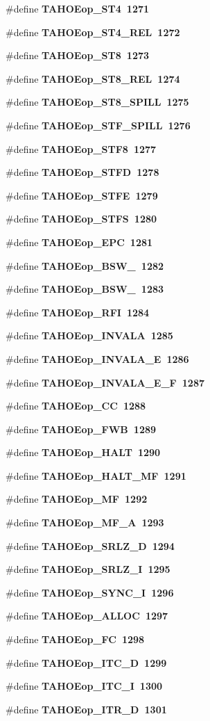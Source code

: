\begin{CompactItemize}
\#define \bf{TAHOEop\_\-ST4}~1271
\item 
\#define \bf{TAHOEop\_\-ST4\_\-REL}~1272
\item 
\#define \bf{TAHOEop\_\-ST8}~1273
\item 
\#define \bf{TAHOEop\_\-ST8\_\-REL}~1274
\item 
\#define \bf{TAHOEop\_\-ST8\_\-SPILL}~1275
\item 
\#define \bf{TAHOEop\_\-STF\_\-SPILL}~1276
\item 
\#define \bf{TAHOEop\_\-STF8}~1277
\item 
\#define \bf{TAHOEop\_\-STFD}~1278
\item 
\#define \bf{TAHOEop\_\-STFE}~1279
\item 
\#define \bf{TAHOEop\_\-STFS}~1280
\item 
\#define \bf{TAHOEop\_\-EPC}~1281
\item 
\#define \bf{TAHOEop\_\-BSW\_}~1282
\item 
\#define \bf{TAHOEop\_\-BSW\_}~1283
\item 
\#define \bf{TAHOEop\_\-RFI}~1284
\item 
\#define \bf{TAHOEop\_\-INVALA}~1285
\item 
\#define \bf{TAHOEop\_\-INVALA\_\-E}~1286
\item 
\#define \bf{TAHOEop\_\-INVALA\_\-E\_\-F}~1287
\item 
\#define \bf{TAHOEop\_\-CC}~1288
\item 
\#define \bf{TAHOEop\_\-FWB}~1289
\item 
\#define \bf{TAHOEop\_\-HALT}~1290
\item 
\#define \bf{TAHOEop\_\-HALT\_\-MF}~1291
\item 
\#define \bf{TAHOEop\_\-MF}~1292
\item 
\#define \bf{TAHOEop\_\-MF\_\-A}~1293
\item 
\#define \bf{TAHOEop\_\-SRLZ\_\-D}~1294
\item 
\#define \bf{TAHOEop\_\-SRLZ\_\-I}~1295
\item 
\#define \bf{TAHOEop\_\-SYNC\_\-I}~1296
\item 
\#define \bf{TAHOEop\_\-ALLOC}~1297
\item 
\#define \bf{TAHOEop\_\-FC}~1298
\item 
\#define \bf{TAHOEop\_\-ITC\_\-D}~1299
\item 
\#define \bf{TAHOEop\_\-ITC\_\-I}~1300
\item 
\#define \bf{TAHOEop\_\-ITR\_\-D}~1301
\item 

\end{CompactItemize}
